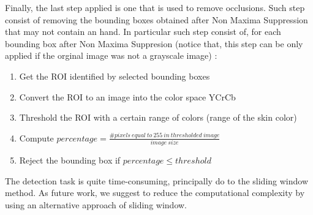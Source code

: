 Finally, the last step applied is one that is used to remove occlusions. Such step consist of removing the bounding boxes obtained after Non Maxima Suppression that may not contain an hand.
In particular such step consist of, for each bounding box after Non Maxima Suppresion (notice that, this step can be only applied if the orginal image was not a grayscale image) : 
\begin{enumerate}
    \item Get the ROI identified by selected bounding boxes
    \item Convert the ROI to an image into the color space YCrCb
    \item Threshold the ROI with a certain range of colors (range of the skin color)
    \item Compute \( percentage = \frac{\#pixels\:equal\:to\:255\:in\:thresholded\:image}{image\:size}\)
    \item Reject the bounding box if \( percentage \leq threshold \)
\end{enumerate}
The detection task is quite time-consuming, principally do to the sliding window method. As future work, we suggest to reduce the computational complexity by using an alternative approach of sliding window.